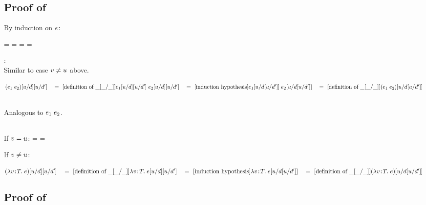 \subsection*{Proof of }

By induction on $e$:

\begin{bycase}

\Case{$\varI$}
\StepO
{
 =
 =
 }
{}
\Case{$\var\neq\varI$}
\StepO
{
 =
 \var
 =
 }
{}

\Case{$\opO$, $\descopO$, $\pjop{\fnam}$}:\\
Similar to case $\var\neq\varI$ above.

\Case{$\appO$}
\begin{links}
$(e_1\;e_2)[u/d][u/d']
 \\\hspace*{1em}=\ [\mbox{definition of $\_[\_/\_]$}]\\
 e_1[u/d][u/d']\;e_2[u/d][u/d']
 \\\hspace*{1em}=\ [\mbox{induction hypothesis}]\\
 e_1[u/d[u/d']]\;e_2[u/d[u/d']]
 \\\hspace*{1em}=\ [\mbox{definition of $\_[\_/\_]$}]\\
 (e_1\;e_2)[u/d[u/d']]$
\end{links}

\Case{$\eqO$, $\iifO$}\\
Analogous to $\appO$.

\Case{$\absO$}\\
If $v=u$:
\StepO
{
 =
 \absO
 =
 }
{}

\noindent
If $\var\neq\varI$:
\begin{links}
$\esbs{\esbsO{(\absO)}}{\varI}{\exprI'}
 \link{=}{\defof{\esbsY}}
 \abs{\var}{\typ}{\esbs{\esbsO{\expr}}{\varI}{\exprI'}}
 \link{=}{\indhyp}
 \abs{\var}{\typ}{\esbs{\expr}{\varI}{\esbs{\exprI}{\varI}{\exprI'}}}
 \link{=}{\defof{\esbsY}}
 \esbs{(\absO)}{\varI}{\esbs{\exprI}{\varI}{\exprI'}}$
\end{links}

\end{bycase}



\subsection*{Proof of }

